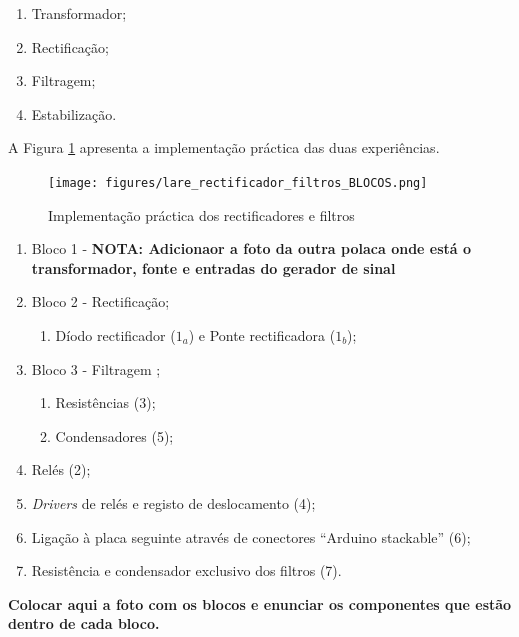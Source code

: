 \begin{enumerate}
	\item Transformador;
	\item Rectificação;
	\item Filtragem;
	\item Estabilização.
\end{enumerate}

A Figura \ref{fig:placarectificadores} apresenta a implementação práctica das duas experiências. 

\begin{figure}[hbtp]
	\centering
	\texttt{[image: figures/lare\_rectificador\_filtros\_BLOCOS.png]}
	\caption{Implementação práctica dos rectificadores e filtros}
	\label{fig:placarectificadores}
\end{figure}

\begin{enumerate}
	\item Bloco 1 - \textbf{NOTA: Adicionaor a foto da outra polaca onde está o transformador, fonte e entradas do gerador de sinal}
	\item Bloco 2 - Rectificação;
		\begin{enumerate}
			\item \label{diodos}Díodo rectificador ($1_{a}$) e Ponte rectificadora ($1_{b}$);	
		\end{enumerate}
	\item Bloco 3 - Filtragem ;
		\begin{enumerate}
			\item \label{resistencias}Resistências (3);
			\item \label{condensadores}Condensadores (5);
		\end{enumerate}
	\item Relés (2);
	\item \textit{Drivers} de relés e registo de deslocamento (4);
	\item Ligação à placa seguinte através de conectores ``Arduino stackable'' (6);
	\item Resistência e condensador exclusivo dos filtros (7).
\end{enumerate}

\textbf{Colocar aqui a foto com os blocos e enunciar os componentes que estão dentro de cada bloco.}


